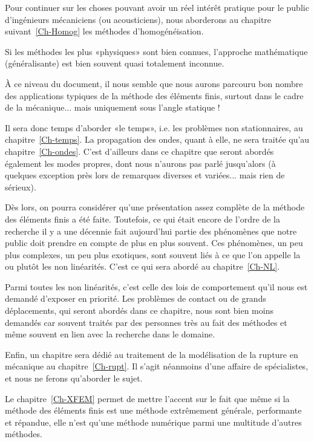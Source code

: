 \medskip
Pour continuer sur les choses pouvant avoir un réel intérêt pratique pour le public d'ingénieurs mécaniciens (ou acousticiens), nous aborderons au chapitre suivant~\ref{Ch-Homog} les méthodes d'homogénéisation.

Si les méthodes les plus «physiques» sont bien connues, l'approche mathématique (généralisante) est bien souvent quasi totalement inconnue.

\medskip
À ce niveau du document, il nous semble que nous aurons parcouru bon nombre des applications typiques de la méthode des éléments finis, surtout dans le cadre de la mécanique... mais uniquement sous l'angle statique !

Il sera donc temps d'aborder «le temps», i.e. les problèmes non stationnaires, au chapitre~\ref{Ch-temps}.
La propagation des ondes, quant à elle, ne sera traitée qu'au chapitre~\ref{Ch-ondes}. C'est d'ailleurs dans ce chapitre que seront abordés également les modes propres, dont nous n'aurons pas parlé jusqu'alors (à quelques exception près lors de remarques diverses et variées... mais rien de sérieux).

\medskip
Dès lors, on pourra considérer qu'une présentation assez complète de la méthode des éléments finis a été faite. Toutefois, ce qui était encore de l'ordre de la recherche il y a une décennie fait aujourd'hui partie des phénomènes que notre public doit prendre en compte de plus en plus souvent. Ces phénomènes, un peu plus complexes, un peu plus exotiques, sont souvent liés à ce que l'on appelle la ou plutôt les non linéarités. C'est ce qui sera abordé au chapitre~\ref{Ch-NL}.

Parmi toutes les non linéarités, c'est celle des lois de comportement qu'il nous est demandé d'exposer en priorité. Les problèmes de contact ou de grands déplacements, qui seront abordés dans ce chapitre, nous sont bien moins demandés car souvent traités par des personnes très au fait des méthodes et même souvent en lien avec la recherche dans le domaine.

\medskip
Enfin, un chapitre sera dédié au traitement de la modélisation de la rupture en mécanique
au chapitre~\ref{Ch-rupt}. Il s'agit néanmoins d'une affaire de spécialistes, et nous ne ferons qu'aborder le sujet.

\medskip
Le chapitre~\ref{Ch-XFEM} permet de mettre l'accent sur le fait que même si la méthode des éléments finis est une méthode extrêmement générale, performante et répandue, elle n'est qu'une méthode numérique parmi une multitude d'autres méthodes.

